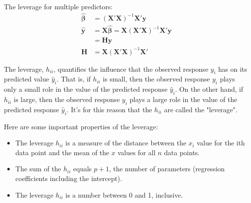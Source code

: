    \documentclass[12pt,fleqn,a4paper]{article}%
\theoremstyle{definition}
\theoremstyle{plain}
\numberwithin{equation}{section}
\begin{document}
The leverage for multiple predictors:
\begin{align*}
\boldsymbol{\hat{\beta}} &= (\mathbf{X'}\mathbf{X})^{-1}\mathbf{X'}\mathbf{y} \\
\mathbf{\hat{y}}  &= \mathbf{X}\boldsymbol{\hat{\beta}}= \mathbf{X}(\mathbf{X'}\mathbf{X})^{-1}\mathbf{X'}\mathbf{y} \\
		&= \mathbf{H}\mathbf{y} \\
\mathbf{H} &= \mathbf{X}(\mathbf{X'}\mathbf{X})^{-1}\mathbf{X'} 
\end{align*}

The leverage, $h_{ii}$, quantifies the influence that the observed response $y_{i}$ has on its predicted value $\hat{y}_{i}$. 
That is, if $h_{ii}$ is small, then the observed response $y_{i}$ plays only a small role in the value of the predicted response $\hat{y}_{i}$. 
On the other hand, if $h_{ii}$ is large, then the observed response $y_{i}$ plays a large role in the value of the predicted response $\hat{y}_{i}$. 
It's for this reason that the $h_{ii}$ are called the "leverage".

Here are some important properties of the leverage:
\begin{itemize}
\item The leverage $h_{ii}$ is a measure of the distance between the $x_{i}$ value for the ith data point and the mean of the $x$ values for all $n$ data points.
\item The sum of the $h_{ii}$ equals $p+1$, the number of parameters (regression coefficients including the intercept).
\item The leverage $h_{ii}$ is a number between 0 and 1, inclusive.
\end{itemize}
\end{document}
